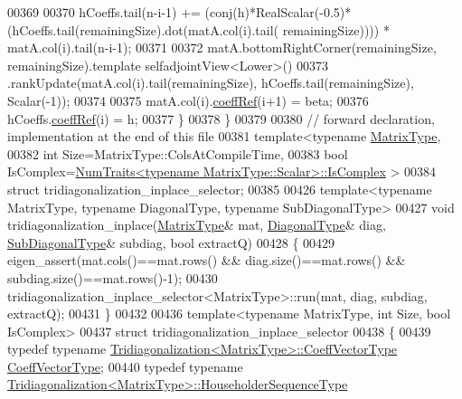 \begin{DoxyCode}
00369 
00370     hCoeffs.tail(n-i-1) += (conj(h)*RealScalar(-0.5)*(hCoeffs.tail(remainingSize).dot(matA.col(i).tail(
      remainingSize)))) * matA.col(i).tail(n-i-1);
00371 
00372     matA.bottomRightCorner(remainingSize, remainingSize).template selfadjointView<Lower>()
00373       .rankUpdate(matA.col(i).tail(remainingSize), hCoeffs.tail(remainingSize), Scalar(-1));
00374 
00375     matA.col(i).\hyperlink{class_eigen_1_1_plain_object_base_a25626a55b26a4323565f79d1b7c48ea8}{coeffRef}(i+1) = beta;
00376     hCoeffs.\hyperlink{class_eigen_1_1_plain_object_base_a25626a55b26a4323565f79d1b7c48ea8}{coeffRef}(i) = h;
00377   \}
00378 \}
00379 
00380 \textcolor{comment}{// forward declaration, implementation at the end of this file}
00381 \textcolor{keyword}{template}<\textcolor{keyword}{typename} \hyperlink{group___eigenvalues___module_add0f4b2216d0ea8ee0f7d8525deaf0a9}{MatrixType},
00382          \textcolor{keywordtype}{int} Size=MatrixType::ColsAtCompileTime,
00383          \textcolor{keywordtype}{bool} IsComplex=\hyperlink{group___core___module_struct_eigen_1_1_num_traits}{NumTraits<typename MatrixType::Scalar>::IsComplex}
      >
00384 \textcolor{keyword}{struct }tridiagonalization\_inplace\_selector;
00385 
00426 \textcolor{keyword}{template}<\textcolor{keyword}{typename} MatrixType, \textcolor{keyword}{typename} DiagonalType, \textcolor{keyword}{typename} SubDiagonalType>
00427 \textcolor{keywordtype}{void} tridiagonalization\_inplace(\hyperlink{group___eigenvalues___module_add0f4b2216d0ea8ee0f7d8525deaf0a9}{MatrixType}& mat, \hyperlink{class_eigen_1_1internal_1_1_tensor_lazy_evaluator_writable}{DiagonalType}& diag, 
      \hyperlink{group___core___module_class_eigen_1_1_matrix}{SubDiagonalType}& subdiag, \textcolor{keywordtype}{bool} extractQ)
00428 \{
00429   eigen\_assert(mat.cols()==mat.rows() && diag.size()==mat.rows() && subdiag.size()==mat.rows()-1);
00430   tridiagonalization\_inplace\_selector<MatrixType>::run(mat, diag, subdiag, extractQ);
00431 \}
00432 
00436 \textcolor{keyword}{template}<\textcolor{keyword}{typename} MatrixType, \textcolor{keywordtype}{int} Size, \textcolor{keywordtype}{bool} IsComplex>
00437 \textcolor{keyword}{struct }tridiagonalization\_inplace\_selector
00438 \{
00439   \textcolor{keyword}{typedef} \textcolor{keyword}{typename} \hyperlink{group___core___module}{Tridiagonalization<MatrixType>::CoeffVectorType}
       \hyperlink{group___core___module}{CoeffVectorType};
00440   \textcolor{keyword}{typedef} \textcolor{keyword}{typename} \hyperlink{group___householder___module_class_eigen_1_1_householder_sequence}{Tridiagonalization<MatrixType>::HouseholderSequenceType}

\end{DoxyCode}
